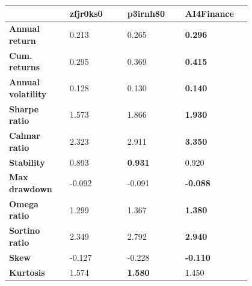 \documentclass[../xlapes02]{subfiles}
\begin{document}
    \begin{table}
        \centering
        {\footnotesize
            \begin{tabular}{*{4}{|m{0.20\linewidth}|}}
                \toprule
                & \bfseries zfjr0ks0                   & \bfseries p3irnh80                    & \bfseries AI4Finance \\[0.5cm]
                \midrule
                \bfseries Annual return       & 0.213                                & 0.265                                 & \color[HTML]{00F000} \bfseries 0.296 \\[0.5cm]
                \bfseries Cum. returns        & 0.295                                & 0.369                                 & \color[HTML]{00F000} \bfseries 0.415 \\[0.5cm]
                \bfseries Annual volatility   & 0.128                                & 0.130                                 & \color[HTML]{00F000} \bfseries 0.140 \\[0.5cm]
                \bfseries Sharpe ratio        & 1.573                                & 1.866                                 & \color[HTML]{00F000} \bfseries 1.930 \\[0.5cm]
                \bfseries Calmar ratio        & 2.323                                & 2.911                                 & \color[HTML]{00F000} \bfseries 3.350 \\[0.5cm]
                \bfseries Stability           & 0.893                                & \color[HTML]{00F000} \bfseries 0.931  & 0.920 \\[0.5cm]
                \bfseries Max drawdown        & -0.092                               & -0.091                                & \color[HTML]{00F000} \bfseries -0.088 \\[0.5cm]
                \bfseries Omega ratio         & 1.299                                & 1.367                                 & \color[HTML]{00F000} \bfseries 1.380 \\[0.5cm]
                \bfseries Sortino ratio       & 2.349                                & 2.792                                 & \color[HTML]{00F000} \bfseries 2.940 \\[0.5cm]
                \bfseries Skew                & -0.127                               & -0.228                                & \color[HTML]{00F000} \bfseries -0.110 \\[0.5cm]
                \bfseries Kurtosis            & 1.574                                & \color[HTML]{00F000} \bfseries 1.580  & 1.450 \\[0.5cm]

\end{tabular}}
\end{table}
\end{document}
